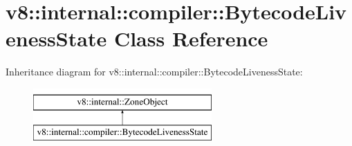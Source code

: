 \hypertarget{classv8_1_1internal_1_1compiler_1_1BytecodeLivenessState}{}\section{v8\+:\+:internal\+:\+:compiler\+:\+:Bytecode\+Liveness\+State Class Reference}
\label{classv8_1_1internal_1_1compiler_1_1BytecodeLivenessState}
Inheritance diagram for v8\+:\+:internal\+:\+:compiler\+:\+:Bytecode\+Liveness\+State\+:\begin{figure}[H]
\begin{center}
\leavevmode
\includegraphics[height=2.000000cm]{classv8_1_1internal_1_1compiler_1_1BytecodeLivenessState}
\end{center}
\end{figure}
